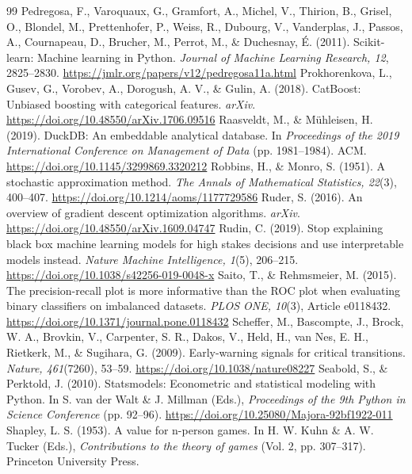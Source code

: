 \begin{thebibliography}{99}
 Pedregosa, F., Varoquaux, G., Gramfort, A., Michel, V., Thirion, B., Grisel, O., Blondel, M., Prettenhofer, P., Weiss, R., Dubourg, V., Vanderplas, J., Passos, A., Cournapeau, D., Brucher, M., Perrot, M., \& Duchesnay, É. (2011). Scikit-learn: Machine learning in Python. \textit{Journal of Machine Learning Research, 12}, 2825--2830. \url{https://jmlr.org/papers/v12/pedregosa11a.html}
 Prokhorenkova, L., Gusev, G., Vorobev, A., Dorogush, A. V., \& Gulin, A. (2018). CatBoost: Unbiased boosting with categorical features. \textit{arXiv}. \url{https://doi.org/10.48550/arXiv.1706.09516}
 Raasveldt, M., \& Mühleisen, H. (2019). DuckDB: An embeddable analytical database. In \textit{Proceedings of the 2019 International Conference on Management of Data} (pp. 1981--1984). ACM. \url{https://doi.org/10.1145/3299869.3320212}
 Robbins, H., \& Monro, S. (1951). A stochastic approximation method. \textit{The Annals of Mathematical Statistics, 22}(3), 400--407. \url{https://doi.org/10.1214/aoms/1177729586}
 Ruder, S. (2016). An overview of gradient descent optimization algorithms. \textit{arXiv}. \url{https://doi.org/10.48550/arXiv.1609.04747}
 Rudin, C. (2019). Stop explaining black box machine learning models for high stakes decisions and use interpretable models instead. \textit{Nature Machine Intelligence, 1}(5), 206--215. \url{https://doi.org/10.1038/s42256-019-0048-x}
 Saito, T., \& Rehmsmeier, M. (2015). The precision-recall plot is more informative than the ROC plot when evaluating binary classifiers on imbalanced datasets. \textit{PLOS ONE, 10}(3), Article e0118432. \url{https://doi.org/10.1371/journal.pone.0118432}
 Scheffer, M., Bascompte, J., Brock, W. A., Brovkin, V., Carpenter, S. R., Dakos, V., Held, H., van Nes, E. H., Rietkerk, M., \& Sugihara, G. (2009). Early-warning signals for critical transitions. \textit{Nature, 461}(7260), 53--59. \url{https://doi.org/10.1038/nature08227}
 Seabold, S., \& Perktold, J. (2010). Statsmodels: Econometric and statistical modeling with Python. In S. van der Walt \& J. Millman (Eds.), \textit{Proceedings of the 9th Python in Science Conference} (pp. 92--96). \url{https://doi.org/10.25080/Majora-92bf1922-011}
 Shapley, L. S. (1953). A value for n-person games. In H. W. Kuhn \& A. W. Tucker (Eds.), \textit{Contributions to the theory of games} (Vol. 2, pp. 307--317). Princeton University Press.%

\end{thebibliography}
